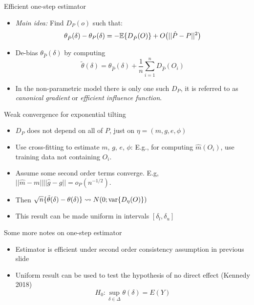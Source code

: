 \documentclass{beamer}
\begin{document}

\begin{frame}{Efficient one-step estimator}
  \begin{itemize}
  \item \textit{Main idea:} Find $D_P(o)$ such that:
    \[\theta_{\hat P}(\delta) - \theta_P(\delta) = -\mathbb{E}\{ D_{\hat
        P}(O)\} + O\big(||\hat P - P||^2\big)\]
  \item De-bias $\theta_{\hat P}(\delta)$ by computing
    \[\tilde \theta(\delta) = \theta_{\hat P}(\delta) +
      \frac{1}{n}\sum_{i=1}^n D_{\hat P}(O_i)\]
  \item In the non-parametric model there is only one such $D_P$, it
    is referred to as \textit{canonical gradient} or \textit{efficient
      influence function}.
  \end{itemize}

\note{
}

\end{frame}


\begin{frame}{Weak convergence for exponential tilting}
  \begin{itemize}
    \item $D_P$ does not depend on all of $P$, just on $\eta=(m,g,e,\phi)$
    \item Use cross-fitting to estimate $m$, $g$, $e$, $\phi$: E.g.,
      for computing $\hat m(O_i)$, use training data not containing
      $O_i$.
  \item Assume some second order terms converge. E.g,
    $||\hat{m} - m||||\hat{g} - g|| = o_P(n^{-1/2}).$
      \item   Then
        $\sqrt{n}\{\tilde \theta(\delta) - \theta(\delta)\} \rightsquigarrow
          N(0;\operatorname{var}\{D_{\eta} (O)\})$
      \item This result can be made uniform in intervals $[\delta_l,\delta_u]$
  \end{itemize}

\note{
}

\end{frame}


\begin{frame}{Some more notes on one-step estimator}
  \begin{itemize}
  \item Estimator is efficient under second order consistency
    assumption in previous slide
  \item Uniform result can be used to test the hypothesis of no
    direct effect (Kennedy 2018)
    \[H_0 : \sup_{\delta \in \Delta} \theta(\delta) =
      E(Y)\]
  \end{itemize}

\note{
}

\end{frame}
\end{document}
